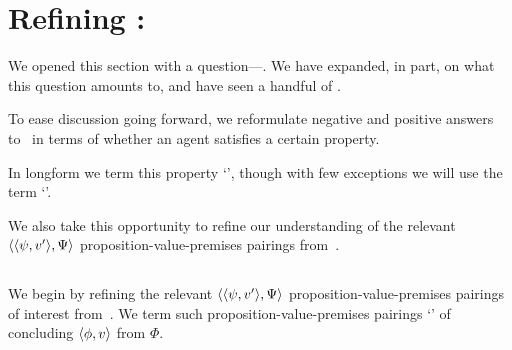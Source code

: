 \section{Refining : \zetaS{}}

\begin{note}
  We opened this section with a question---\qzS{}.
  We have expanded, in part, on what this question amounts to, and have seen a handful of .

  To ease discussion going forward, we reformulate negative and positive answers to~\qzS{} in terms of whether an agent satisfies a certain property.

  In longform we term this property `', though with few exceptions we will use the term `'.

  We also take this opportunity to refine our understanding of the relevant \(\langle \langle \psi, v' \rangle, \Psi \rangle\) proposition-value-premises pairings from~\qzS{}.
\end{note}

\subsection{}

\begin{note}
  We begin by refining the relevant \(\langle \langle \psi, v' \rangle, \Psi \rangle\) proposition-value-premises pairings of interest from~\qzS{}.
  We term such proposition-value-premises pairings `' of concluding \(\langle \phi, v \rangle\) from \(\Phi\).
\end{note}

